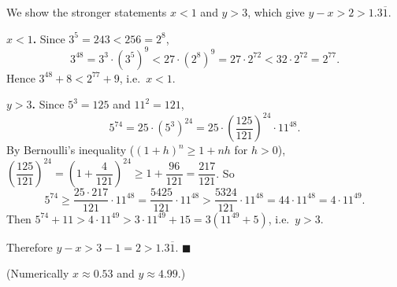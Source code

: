 We show the stronger statements $x<1$ and $y>3$, which give $y-x>2>1.3\overline1$.

\textbf{$x<1$.} Since $3^5=243<256=2^8$,
\[
3^{48}=3^3\cdot\left(3^5\right)^9<27\cdot\left(2^8\right)^9=27\cdot2^{72}<32\cdot2^{72}=2^{77}.
\]
Hence $3^{48}+8<2^{77}+9$, i.e.\ $x<1$.

\textbf{$y>3$.} Since $5^3=125$ and $11^2=121$,
\[
5^{74}=25\cdot\left(5^3\right)^{24}=25\cdot\left(\dfrac{125}{121}\right)^{24}\cdot11^{48}.
\]
By Bernoulli's inequality ($(1+h)^n\ge1+nh$ for $h>0$), $\left(\dfrac{125}{121}\right)^{24}=\left(1+\dfrac{4}{121}\right)^{24}\ge1+\dfrac{96}{121}=\dfrac{217}{121}$. So
\[
5^{74}\ge\dfrac{25\cdot217}{121}\cdot11^{48}=\dfrac{5425}{121}\cdot11^{48}>\dfrac{5324}{121}\cdot11^{48}=44\cdot11^{48}=4\cdot11^{49}.
\]
Then $5^{74}+11>4\cdot11^{49}>3\cdot11^{49}+15=3\left(11^{49}+5\right)$, i.e.\ $y>3$.

Therefore $y-x>3-1=2>1.3\overline1$. $\blacksquare$

(Numerically $x\approx0.53$ and $y\approx4.99$.)
